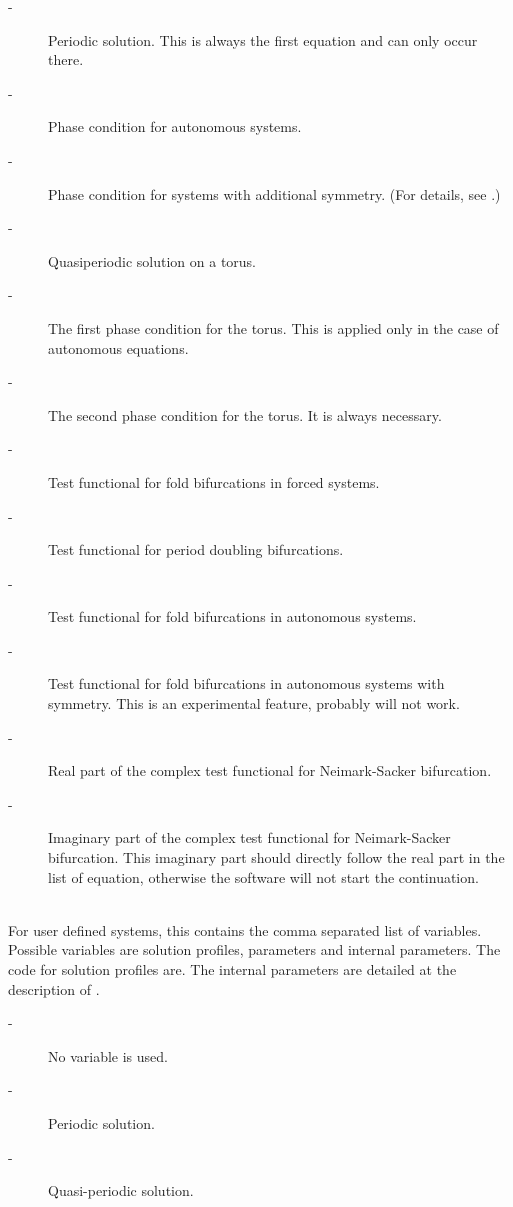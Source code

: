 \documentclass[10pt,a4paper]{ddedoc}
\begin{document}
\begin{description}
\begin{description}
\item[ -] Periodic solution. This is always the first equation and can
only occur there.
\item[ -] Phase condition for autonomous systems.
\item[ -] Phase condition for systems with additional symmetry. (For
details, see \cite{haegeman,roose-szalai}.)
\item[ -] Quasiperiodic solution on a torus.
\item[ -] The first phase condition for the torus. This is applied
only in the case of autonomous equations.
\item[ -] The second phase condition for the torus. It is always
necessary.
\item[ -] Test functional for fold bifurcations in forced systems.
\item[ -] Test functional for period doubling bifurcations.
\item[ -] Test functional for fold bifurcations in autonomous systems.
\item[ -] Test functional for fold bifurcations in autonomous systems
with symmetry. This is an experimental feature, probably will not work.
\item[ -] Real part of the complex test functional for Neimark-Sacker
bifurcation.
\item[ -] Imaginary part of the complex test functional for
Neimark-Sacker bifurcation. This imaginary part should directly follow the real
part in the list of equation, otherwise the software will not start the
continuation.
\end{description}
%
\item[\funp{vars}] ~\\
For user defined systems, this contains the comma separated list of variables. Possible variables are solution profiles, parameters and internal parameters. The code for solution profiles are. The internal parameters are detailed at the description of .
\begin{description}
\item[ -] No variable is used.
\item[ -] Periodic solution.
\item[ -] Quasi-periodic solution.
\end{description}

\end{description}
\end{document}

